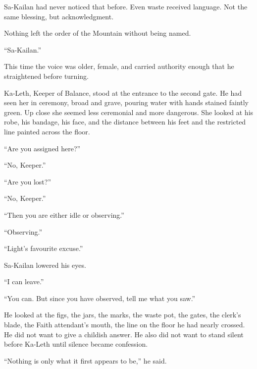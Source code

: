 Sa-Kailan had never noticed that before.
Even waste received language.
Not the same blessing, but acknowledgment.\par

Nothing left the order of the Mountain without being named.\par

“Sa-Kailan.”\par

This time the voice was older, female, and carried authority enough that he straightened before turning.\par

Ka-Leth, Keeper of Balance, stood at the entrance to the second gate.
He had seen her in ceremony, broad and grave, pouring water with hands stained faintly green.
Up close she seemed less ceremonial and more dangerous.
She looked at his robe, his bandage, his face, and the distance between his feet and the restricted line painted across the floor.\par

“Are you assigned here?”\par

“No, Keeper.”\par

“Are you lost?”\par

“No, Keeper.”\par

“Then you are either idle or observing.”\par

“Observing.”\par

“Light’s favourite excuse.”\par

Sa-Kailan lowered his eyes.\par

“I can leave.”\par

“You can.
But since you have observed, tell me what you saw.”\par

He looked at the figs, the jars, the marks, the waste pot, the gates, the clerk’s blade, the Faith attendant’s mouth, the line on the floor he had nearly crossed.
He did not want to give a childish answer.
He also did not want to stand silent before Ka-Leth until silence became confession.\par

“Nothing is only what it first appears to be,” he said.\par

